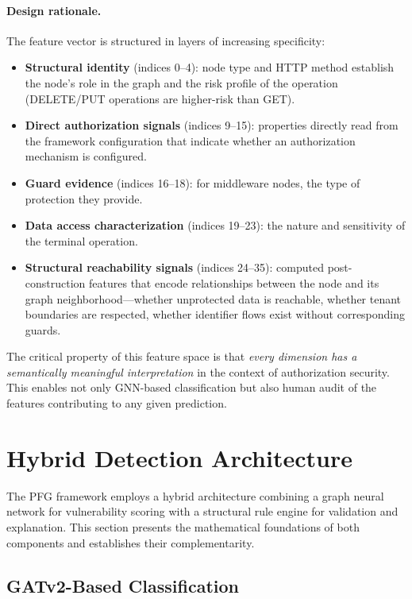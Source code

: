 \paragraph{Design rationale.} The feature vector is structured in layers of increasing specificity:
\begin{itemize}
    \item \textbf{Structural identity} (indices 0--4): node type and HTTP method establish the node's role in the graph and the risk profile of the operation (DELETE/PUT operations are higher-risk than GET).
    \item \textbf{Direct authorization signals} (indices 9--15): properties directly read from the framework configuration that indicate whether an authorization mechanism is configured.
    \item \textbf{Guard evidence} (indices 16--18): for middleware nodes, the type of protection they provide.
    \item \textbf{Data access characterization} (indices 19--23): the nature and sensitivity of the terminal operation.
    \item \textbf{Structural reachability signals} (indices 24--35): computed post-construction features that encode relationships between the node and its graph neighborhood—whether unprotected data is reachable, whether tenant boundaries are respected, whether identifier flows exist without corresponding guards.
\end{itemize}

The critical property of this feature space is that \emph{every dimension has a semantically meaningful interpretation} in the context of authorization security. This enables not only GNN-based classification but also human audit of the features contributing to any given prediction.

\section{Hybrid Detection Architecture}
\label{sec:architecture}

The PFG framework employs a hybrid architecture combining a graph neural network for vulnerability scoring with a structural rule engine for validation and explanation. This section presents the mathematical foundations of both components and establishes their complementarity.

\subsection{GATv2-Based Classification}

